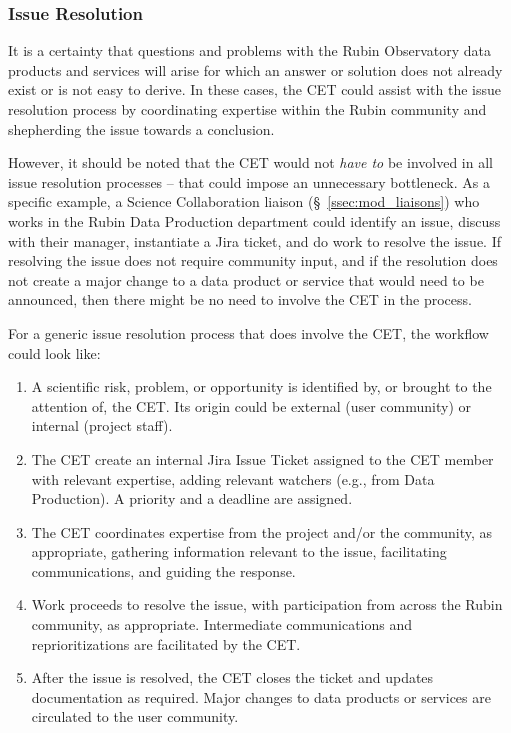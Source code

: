 \documentclass[DM,lsstdraft,toc]{lsstdoc}
\begin{document}
\subsubsection{Issue Resolution}\label{sssec:mod_coord_res}

It is a certainty that questions and problems with the Rubin Observatory data products and services will arise for which an answer or solution does not already exist or is not easy to derive. 
In these cases, the CET could assist with the issue resolution process by coordinating expertise within the Rubin community and shepherding the issue towards a conclusion.

However, it should be noted that the CET would not \textit{have to} be involved in all issue resolution processes -- that could impose an unnecessary bottleneck.
As a specific example, a Science Collaboration liaison (\S~\ref{ssec:mod_liaisons}) who works in the Rubin Data Production department could identify an issue, discuss with their manager, instantiate a Jira ticket, and do work to resolve the issue.
If resolving the issue does not require community input, and if the resolution does not create a major change to a data product or service that would need to be announced, then there might be no need to involve the CET in the process.

For a generic issue resolution process that does involve the CET, the workflow could look like:
\begin{enumerate}
\item A scientific risk, problem, or opportunity is identified by, or brought to the attention of, the CET. Its origin could be external (user community) or internal (project staff).
\item The CET create an internal Jira Issue Ticket assigned to the CET member with relevant expertise, adding relevant watchers (e.g., from Data Production). A priority and a deadline are assigned. 
\item The CET coordinates expertise from the project and/or the community, as appropriate, gathering information relevant to the issue, facilitating communications, and guiding the response.
\item Work proceeds to resolve the issue, with participation from across the Rubin community, as appropriate. Intermediate communications and reprioritizations are facilitated by the CET.
\item After the issue is resolved, the CET closes the ticket and updates documentation as required. Major changes to data products or services are circulated to the user community.
\end{enumerate}
\end{document}
